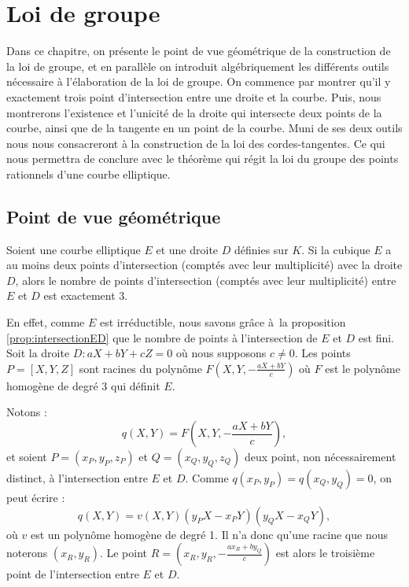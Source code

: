 \chapter{Loi de groupe}
\begin{center}
    Dans ce chapitre, on présente le point de vue géométrique de la construction de la loi de
    groupe, et en parallèle on introduit algébriquement les différents outils nécessaire à
    l'élaboration de la loi de groupe. On commence par montrer qu'il y exactement trois point
    d'intersection entre une droite et la courbe. Puis, nous montrerons l'existence et
    l'unicité de la droite qui intersecte deux points de la courbe, ainsi que de la tangente en
    un point de la courbe. Muni de ses deux outils nous nous consacreront à la construction de
    la loi des cordes-tangentes. Ce qui nous permettra de conclure avec le théorème qui régit
    la loi du groupe des points rationnels d'une courbe elliptique.
\end{center}


\section{Point de vue géométrique}

\begin{proposition}
    \label{prop:secTanGeo}
    
    Soient une courbe elliptique $E$ et une droite $D$ définies sur
    $K$. Si la cubique $E$ a au moins deux points d'intersection (comptés avec leur
    multiplicité) avec la droite $D$, alors le nombre de points d'intersection (comptés avec
    leur multiplicité) entre $E$ et $D$ est exactement $3$.
\end{proposition}

\begin{demonstration}
   En effet, comme $E$ est irréductible, nous savons grâce à la proposition
   \ref{prop:intersectionED}  que le
   nombre de points à l'intersection de $E$ et $D$ est fini. Soit la droite $D : aX + bY + cZ =
   0$ où nous supposons $c \neq 0$. Les points $P = [X,Y,Z]$ sont racines du polynôme $F(X,Y,-
   \frac{aX+bY}{c})$ où $F$ est le polynôme homogène de degré 3 qui définit $E$. 

   Notons :
   \[
   q(X,Y)=F(X,Y,- \frac{aX + bY}{c})
   ,\] 
   et soient $P=(x_{P},y_{P},z_{P})$ et $Q=(x_{Q},y_{Q},z_{Q})$ deux point, non nécessairement
   distinct, à l'intersection
   entre $E$ et $D$. Comme $q(x_{P},y_{P}) = q(x_{Q},y_{Q})=0$, on peut écrire : 
   \[
   q(X,Y)=v(X,Y)(y_{P}X-x_{P}Y)(y_{Q}X-x_{Q}Y)
   ,\] 
   où $v$ est un polynôme homogène de degré 1. Il n'a donc qu'une racine que nous noterons
   $(x_{R},y_{R})$. Le point $R=(x_{R},y_{R},- \frac{ax_{R}+by_{Q}}{c})$ est alors le troisième
   point de l'intersection entre $E$ et $D$.
\end{demonstration}

